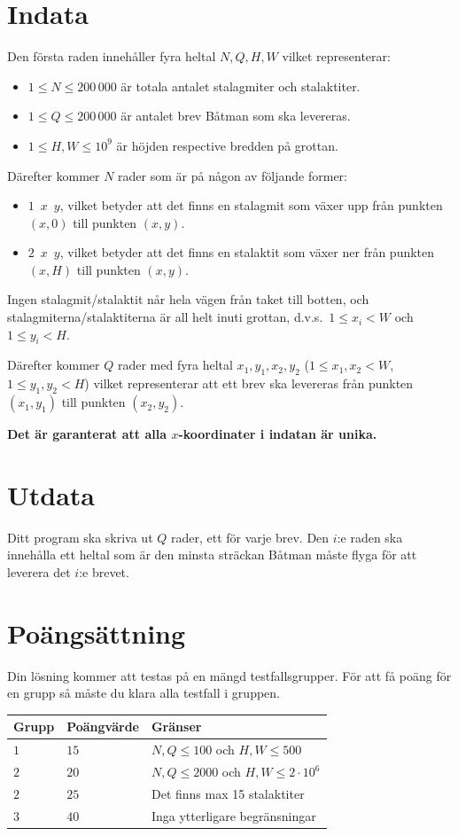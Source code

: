 \section*{Indata}
Den första raden innehåller fyra heltal $N,Q,H,W$ vilket representerar:
\begin{itemize}
  \item $1 \le N\le 200\,000$ är totala antalet stalagmiter och stalaktiter.
  \item $1 \le Q\le 200\,000$ är antalet brev Båtman som ska levereras.
  \item $1 \le H,W\le 10^9$ är höjden respective bredden på grottan.
\end{itemize}
Därefter kommer $N$ rader som är på någon av följande former:
\begin{itemize}
  \item $1\enspace x\enspace y$, vilket betyder att det finns en stalagmit
    som växer upp från punkten $(x,0)$ till punkten $(x,y)$.
  \item $2\enspace x\enspace y$, vilket betyder att det finns en stalaktit
    som växer ner från punkten $(x,H)$ till punkten $(x,y)$.
\end{itemize}
Ingen stalagmit/stalaktit når hela vägen från taket till botten,
och stalagmiterna/stalaktiterna är all helt inuti grottan,
d.v.s.\ $1\le x_{i} < W$ och $1\le y_{i} < H$.

Därefter kommer $Q$ rader med fyra heltal
$x_{1},y_{1},x_{2},y_{2}$ ($1\le x_{1},x_{2} < W$, $1\le y_{1},y_{2}< H$) vilket representerar att ett brev ska levereras från
punkten $(x_{1},y_{1})$ till punkten $(x_{2},y_{2})$.

\textbf{Det är garanterat att alla $x$-koordinater i indatan är unika.}

\section*{Utdata}
Ditt program ska skriva ut $Q$ rader, ett för varje brev.
Den $i$:e raden ska innehålla ett heltal som är den minsta
sträckan Båtman måste flyga för att leverera det $i$:e brevet.

\section*{Poängsättning}
Din lösning kommer att testas på en mängd testfallsgrupper.
För att få poäng för en grupp så måste du klara alla testfall i gruppen.

\noindent
\begin{tabular}{| l | l | l |}
\hline
Grupp & Poängvärde & Gränser \\ \hline
$1$    & $15$         & $N,Q\le 100$ och $H,W\le 500$ \\ \hline
$2$    & $20$         & $N,Q \le 2000$ och $H,W\le 2\cdot 10^6$\\ \hline
$2$    & $25$         & Det finns max 15 stalaktiter \\ \hline
$3$    & $40$         & Inga ytterligare begränsningar \\ \hline
\end{tabular}
